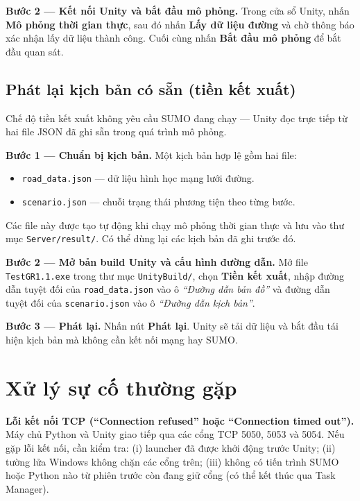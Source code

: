 \documentclass[../DoAn.tex]{subfiles}
\begin{document}
\textbf{Bước 2 — Kết nối Unity và bắt đầu mô phỏng.}
Trong cửa sổ Unity, nhấn \textbf{Mô phỏng thời gian thực},
sau đó nhấn \textbf{Lấy dữ liệu đường} và chờ thông báo xác nhận
lấy dữ liệu thành công. Cuối cùng nhấn \textbf{Bắt đầu mô phỏng}
để bắt đầu quan sát.

\subsection{Phát lại kịch bản có sẵn (tiền kết xuất)}
\label{subsec:pla-prerender}

Chế độ tiền kết xuất không yêu cầu SUMO đang chạy — Unity đọc trực tiếp
từ hai file JSON đã ghi sẵn trong quá trình mô phỏng.

\textbf{Bước 1 — Chuẩn bị kịch bản.}
Một kịch bản hợp lệ gồm hai file:
\begin{itemize}
    \item \texttt{road\_data.json} — dữ liệu hình học mạng lưới đường.
    \item \texttt{scenario.json} — chuỗi trạng thái phương tiện theo từng bước.
\end{itemize}
Các file này được tạo tự động khi chạy mô phỏng thời gian thực và lưu vào
thư mục \texttt{Server/result/}.
Có thể dùng lại các kịch bản đã ghi trước đó.

\textbf{Bước 2 — Mở bản build Unity và cấu hình đường dẫn.}
Mở file \texttt{TestGR1.1.exe} trong thư mục \texttt{UnityBuild/},
chọn \textbf{Tiền kết xuất}, nhập đường dẫn tuyệt đối của
\texttt{road\_data.json} vào ô \textit{``Đường dẫn bản đồ''} và
đường dẫn tuyệt đối của \texttt{scenario.json} vào ô
\textit{``Đường dẫn kịch bản''}.

\textbf{Bước 3 — Phát lại.}
Nhấn nút \textbf{Phát lại}. Unity sẽ tải dữ liệu và bắt đầu tái hiện
kịch bản mà không cần kết nối mạng hay SUMO.

\section{Xử lý sự cố thường gặp}
\label{sec:pla-sucố}

\textbf{Lỗi kết nối TCP (``Connection refused'' hoặc ``Connection timed out'').}
Máy chủ Python và Unity giao tiếp qua các cổng TCP 5050, 5053 và 5054.
Nếu gặp lỗi kết nối, cần kiểm tra: (i) launcher đã được khởi động trước
Unity; (ii) tường lửa Windows không chặn các cổng trên;
(iii) không có tiến trình SUMO hoặc Python nào từ phiên trước còn đang giữ cổng
(có thể kết thúc qua Task Manager).
\end{document}

